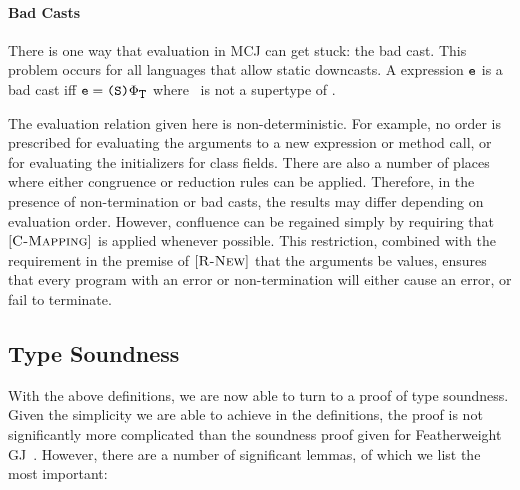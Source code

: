 \documentclass{acmconfbig}
\begin{document}

\paragraph{Bad Casts}
There is one way that evaluation in MCJ can get stuck: the bad cast.
This problem occurs for all languages that allow static downcasts.  A
expression $\mbox {\tt e}$ is a bad cast iff $\mbox {\tt e} = \mbox{\tt \mbox{\tt (}\mbox {\tt S}\mbox{\tt )}{\ensuremath {\Phi_{\mbox {\tt T}}}}}$ where
\SSS\ is not a supertype of \T.

The evaluation relation given here is non-deterministic. For example,
no order is prescribed for evaluating the arguments to a {\txt new}
expression or method call, or for evaluating the initializers for
class fields.  There are also a number of places where either
congruence or reduction rules can be applied.  Therefore, in the
presence of non-termination or bad casts, the results may differ
depending on evaluation order.  However, confluence can be regained
simply by requiring that $[{\textsc {C-Mapping}}]$ is applied whenever
possible.  This restriction, combined with the requirement in the
premise of $[{\textsc {R-New}}]$ that the arguments be values, ensures
that every program with an error or non-termination will either cause
an error, or fail to terminate.  

\figComp



\subsection{Type Soundness}
\label{proof}

With the above definitions, we are now able to turn to a proof of type
soundness. Given the simplicity we are able to achieve in the
definitions, the proof is not significantly more complicated than the
soundness proof given for Featherweight GJ\ \cite{FJ}.  However, there
are a number of significant lemmas, of which we list the most
important:

\fieldsPreservedLemma
\end{document}
